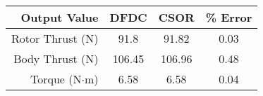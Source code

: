         \begin{tabular}{ r | c | c | c }
            Output Value & DFDC & CSOR & \% Error \\
            \hline
            Rotor Thrust (N) & 91.8 & 91.82 & 0.03 \\
            Body Thrust (N) & 106.45 & 106.96 & 0.48 \\
            Torque (N\(\cdot\)m) & 6.58 & 6.58 & 0.04 \\
        \end{tabular}
